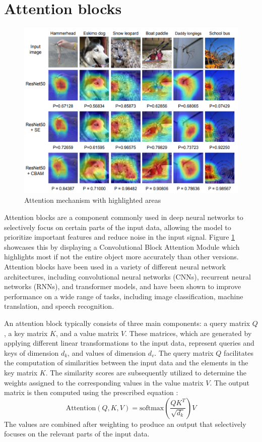 \section{Attention blocks}

\begin{figure}[!htbp]
    \centering
    \centerline{\includegraphics[width=0.8\linewidth]{images/attention.png}}
    \caption{Attention mechanism with highlighted areas \cite{wooCBAMConvolutionalBlock2018}}
    \label{fig:attention_diagram}
\end{figure}

Attention blocks are a component commonly used in deep neural networks to selectively focus on certain parts of the input data, allowing the model to prioritize important features and reduce noise in the input signal. Figure \ref{fig:attention_diagram} showcases this by displaying a Convolutional Block Attention Module which highlights most if not the entire object more accurately than other versions. Attention blocks have been used in a variety of different neural network architectures, including convolutional neural networks (CNNs), recurrent neural networks (RNNs), and transformer models, and have been shown to improve performance on a wide range of tasks, including image classification, machine translation, and speech recognition.

An attention block typically consists of three main components: a query matrix \(Q\), a key matrix \(K\), and a value matrix \(V\). These matrices, which are generated by applying different linear transformations to the input data, represent queries and keys of dimension \(d_k\), and values of dimension \(d_v\). The query matrix \(Q\) facilitates the computation of similarities between the input data and the elements in the key matrix \(K\). The similarity scores are subsequently utilized to determine the weights assigned to the corresponding values in the value matrix \(V\). The output matrix is then computed using the prescribed equation \cite{vaswaniAttentionAllYou2023}:
\[\text{Attention}(Q,K,V) = \text{softmax}(\frac{QK^T}{\sqrt{d_k}})V\]
The values are combined after weighting to produce an output that selectively focuses on the relevant parts of the input data.

